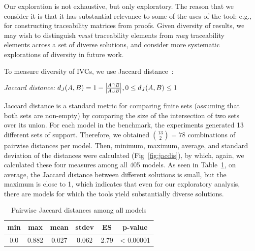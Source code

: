 Our exploration is not exhaustive, but only exploratory.  The reason that we consider it is that it has substantial relevance to some of the uses of the tool: e.g., for constructing traceability matrices from proofs.  Given diversity of results, we may wish to distinguish {\em must} traceability elements from {\em may} traceability elements across a set of diverse solutions, and consider more systematic explorations of diversity in future work.

To measure diversity of IVCs, we use Jaccard distance~:
\begin{definition}{\emph{Jaccard distance:}}
  \label{def:dj}
  $d_J(\small{A}, \small{B}) = 1 - \frac{|A \cap B|}{|A \cup B|} ,\\ 0 \leq d_J(\small{A}, \small{B}) \leq 1$
\end{definition}
\noindent Jaccard distance is a standard metric for comparing finite sets (assuming that both sets are non-empty) by comparing the size of the intersection of two sets over its union.  For each model in the benchmark, the experiments generated 13 different sets of support. Therefore, we obtained $\binom{13}{2} = 78$ combinations of pairwise distances per model. Then, minimum, maximum, average, and standard deviation of the distances were calculated (Fig~\ref{fig:jacdis}), by which, again, we calculated these four measures among all 405 models.  As seen in Table~\ref{tab:78com}, on average, the Jaccard distance between different solutions is small, but the maximum is close to 1, which indicates that even for our exploratory analysis, there are models for which the tools yield substantially diverse solutions.


\begin{table}
  \centering
  \begin{tabular}{ |c|c|c|c|c|c| }
    \hline
     min & max & mean & stdev & ES & p-value\\[0.5ex]
    \hline
     0.0   & 0.882 & 0.027 & 0.062 & 2.79 & < 0.00001 \\[0.5ex]
    \hline
  \end{tabular}
  \caption{Pairwise Jaccard distances among all models}
  \label{tab:78com}
\end{table}

